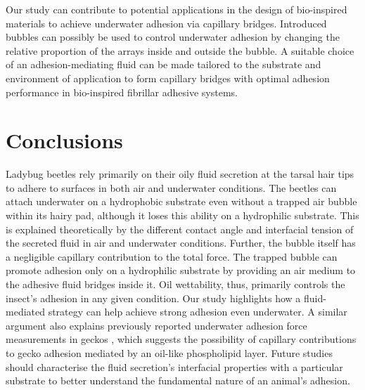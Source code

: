 \documentclass[vruler,JEB]{COB}%
\begin{document}
Our study can contribute to potential applications in the design of bio-inspired materials to achieve underwater adhesion
via capillary bridges. Introduced bubbles can possibly be used to control underwater
adhesion by changing the relative proportion of the arrays inside
and outside the bubble. A suitable choice of an adhesion-mediating fluid can be
made tailored to the substrate and environment of application to form capillary bridges with 
optimal adhesion performance in bio-inspired fibrillar adhesive systems.

\section{Conclusions}

Ladybug beetles rely primarily on their oily fluid secretion at the tarsal hair tips to adhere
to surfaces in both air and underwater conditions. The beetles can
attach underwater on a hydrophobic substrate even without a trapped
air bubble within its hairy pad, although it loses this ability on
a hydrophilic substrate. This is explained theoretically by the different
contact angle and interfacial tension of the secreted fluid in air
and underwater conditions. Further, the bubble itself has a negligible
capillary contribution to the total force. The trapped bubble can
promote adhesion only on a hydrophilic substrate by providing an air
medium to the adhesive fluid bridges inside it. Oil wettability, thus,
primarily controls the insect's adhesion in any given condition. 
Our study highlights how a fluid-mediated strategy can help achieve strong adhesion even underwater. A
similar argument also explains previously reported underwater adhesion force measurements
in geckos \citep{RN15}, which suggests the possibility of capillary
contributions to gecko adhesion mediated by an oil-like phospholipid layer. Future studies should characterise
the fluid secretion's interfacial properties with a particular substrate
to better understand the fundamental nature of an animal's adhesion.



\end{document}
